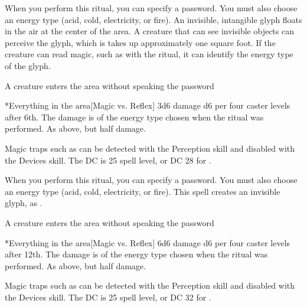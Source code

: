 \spellspecial When you perform this ritual, you can specify a password. You must also choose an energy type (acid, cold, electricity, or fire).
\spellline
\spelleffect An invisible, intangible glyph floats in the air at the center of the area. A creature that can see invisible objects can perceive the glyph, which is takes up approximately one square foot. If the creature can read magic, such as with the  ritual, it can identify the energy type of the glyph.
\begin{spelltrigger}{A creature enters the area without speaking the password}
    \begin{spelltargets}*{Everything in the area}[Magic vs. Reflex]
        \spellsuccess 3d6 damage \add d6 per four caster levels after 6th. The damage is of the energy type chosen when the ritual was performed.
        \spellfailure As above, but half damage.
    \end{spelltargets}
\end{spelltrigger}
\spellnotes Magic traps such as  can be detected with the Perception skill and disabled with the Devices skill. The DC is 25 \add spell level, or DC 28 for .

\spellspecial When you perform this ritual, you can specify a password. You must also choose an energy type (acid, cold, electricity, or fire).
\spellline
\spelleffect This spell creates an invisible glyph, as .
\begin{spelltrigger}{A creature enters the area without speaking the password}
    \begin{spelltargets}*{Everything in the area}[Magic vs. Reflex]
        \spellsuccess 6d6 damage \add d6 per four caster levels after 12th. The damage is of the energy type chosen when the ritual was performed.
        \spellfailure As above, but half damage.
    \end{spelltargets}
\end{spelltrigger}
\spellnotes Magic traps such as  can be detected with the Perception skill and disabled with the Devices skill. The DC is 25 \add spell level, or DC 32 for .

